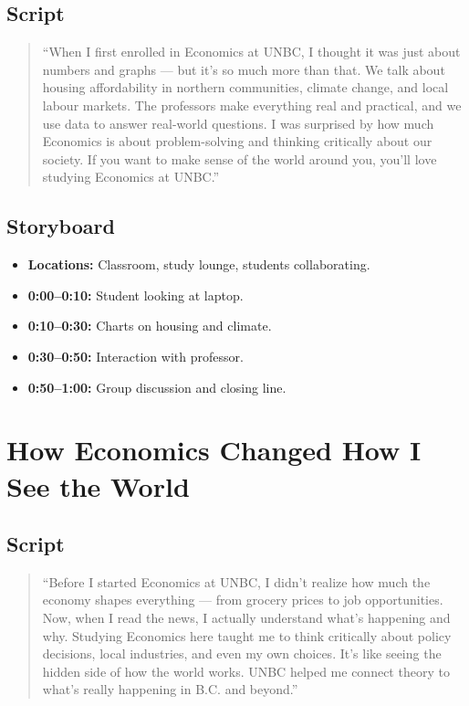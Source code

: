 \documentclass[12pt]{article}
\begin{document}
\subsection*{Script}
\begin{quote}
``When I first enrolled in Economics at UNBC, I thought it was just about numbers and graphs — but it’s so much more than that. 
We talk about housing affordability in northern communities, climate change, and local labour markets. 
The professors make everything real and practical, and we use data to answer real-world questions. 
I was surprised by how much Economics is about problem-solving and thinking critically about our society. 
If you want to make sense of the world around you, you’ll love studying Economics at UNBC.''
\end{quote}

\subsection*{Storyboard}
\begin{itemize}[leftmargin=*]
    \item \textbf{Locations:} Classroom, study lounge, students collaborating.
    \item \textbf{0:00–0:10:} Student looking at laptop.
    \item \textbf{0:10–0:30:} Charts on housing and climate.
    \item \textbf{0:30–0:50:} Interaction with professor.
    \item \textbf{0:50–1:00:} Group discussion and closing line.
\end{itemize}

\section{How Economics Changed How I See the World}

\subsection*{Script}
\begin{quote}
``Before I started Economics at UNBC, I didn’t realize how much the economy shapes everything — from grocery prices to job opportunities. 
Now, when I read the news, I actually understand what’s happening and why. 
Studying Economics here taught me to think critically about policy decisions, local industries, and even my own choices. 
It’s like seeing the hidden side of how the world works. 
UNBC helped me connect theory to what’s really happening in B.C. and beyond.''
\end{quote}
\end{document}
